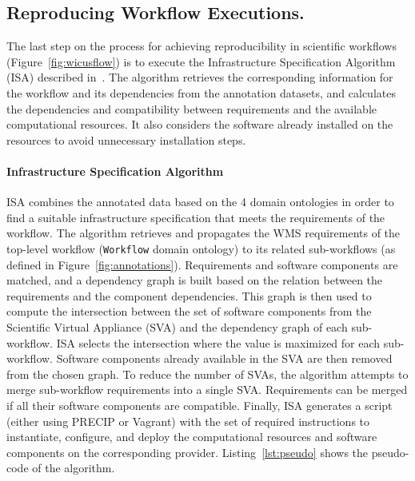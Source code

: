 \subsection{Reproducing Workflow Executions.}

The last step on the process for achieving reproducibility in scientific workflows 
(Figure~\ref{fig:wicusflow}) is to execute the Infrastructure Specification Algorithm 
(ISA) described in~\cite{wicus}. The algorithm retrieves the corresponding information for the 
workflow and its dependencies from the annotation datasets, and calculates the 
dependencies and compatibility between requirements and the available 
computational resources. It also considers the software already installed on the
resources to avoid unnecessary installation steps.

\paragraph{\textbf{Infrastructure Specification Algorithm}}
ISA combines the annotated data based on the 4 
domain ontologies in order to find a suitable infrastructure specification that meets 
the requirements of the workflow. The algorithm retrieves and propagates the WMS 
requirements of the top-level workflow (\texttt{Workflow} domain ontology) to its 
related sub-workflows (as defined in Figure~\ref{fig:annotations}). Requirements 
and software components are matched, and a dependency graph is built based 
on the relation between the requirements and the component dependencies. This 
graph is then used to compute the intersection between the set of software components 
from the Scientific Virtual Appliance (SVA) and the dependency graph of each sub-workflow. ISA selects the 
intersection where the value is maximized for each sub-workflow. Software components 
already available in the SVA are then removed from the chosen graph. To reduce 
the number of SVAs, the algorithm attempts to merge sub-workflow requirements 
into a single SVA. Requirements can be merged if all their software components are 
compatible. Finally, ISA generates a script (either using PRECIP or Vagrant) with 
the set of required instructions to instantiate, configure, and deploy the computational 
resources and software components on the corresponding provider. Listing~\ref{lst:pseudo}
shows the pseudo-code of the algorithm.
          
